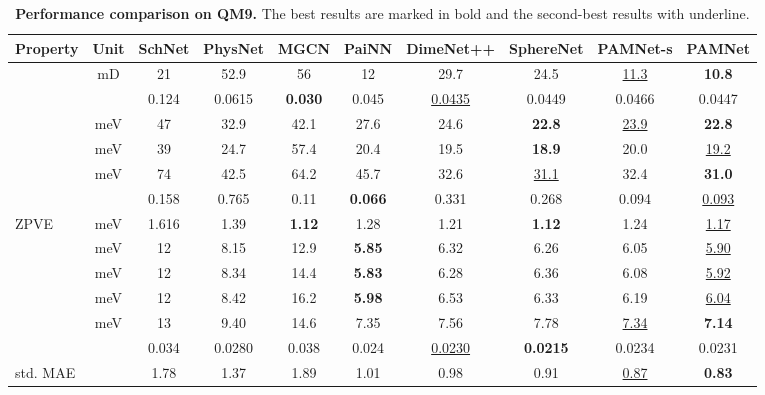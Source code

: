 \documentclass[fleqn,10pt]{wlscirep}
\newcommand{\method}{PAMNet\xspace}
\begin{document}
\begin{table}[t]
\centering
\small
\begin{tabular}{lccccccccc}
\toprule
    {Property} & {Unit} & {SchNet} & {PhysNet} & {MGCN} & {PaiNN} & {DimeNet++} & {SphereNet} & \textbf{\method-s}  & \textbf{\method}\\
\midrule
      &  mD     & 21 & 52.9 & 56 & 12 & 29.7 & 24.5 & \underline{11.3} & \textbf{10.8}\\
     &   & 0.124 & 0.0615 & \textbf{0.030} & 0.045 & \underline{0.0435} & 0.0449 & 0.0466 & 0.0447\\
     & meV  & 47 & 32.9 & 42.1 & 27.6 & 24.6 & \textbf{22.8} & \underline{23.9}  & \textbf{22.8}\\
     & meV  & 39 & 24.7 & 57.4 & 20.4 & 19.5 & \textbf{18.9} & 20.0  & \underline{19.2}\\
     & meV    & 74 & 42.5 & 64.2 & 45.7 & 32.6 & \underline{31.1} & 32.4 & \textbf{31.0}\\
     &   & 0.158 & 0.765 & 0.11 & \textbf{0.066} & 0.331 & 0.268 & 0.094 & \underline{0.093}\\
    ZPVE & meV  & 1.616 & 1.39 & \textbf{1.12} & 1.28 & 1.21 & \textbf{1.12} & 1.24 & \underline{1.17}\\
     & meV & 12 & 8.15 & 12.9 & \textbf{5.85} & 6.32 & 6.26 & 6.05 & \underline{5.90}\\
     & meV  & 12 & 8.34 & 14.4 & \textbf{5.83} & 6.28 & 6.36 & 6.08 & \underline{5.92} \\
     & meV   & 12 & 8.42 & 16.2 & \textbf{5.98} & 6.53 & 6.33 & 6.19 & \underline{6.04} \\
     & meV   & 13 & 9.40 & 14.6 & 7.35 & 7.56 & 7.78 & \underline{7.34} & \textbf{7.14} \\
     &   & 0.034 & 0.0280 & 0.038 & 0.024 & \underline{0.0230} & \textbf{0.0215} & 0.0234 & 0.0231 \\
\midrule
    std. MAE &   & 1.78 & 1.37 & 1.89 & 1.01 & 0.98 & 0.91 & \underline{0.87} & \textbf{0.83}\\
\bottomrule
\end{tabular}
\caption{\textbf{Performance comparison on QM9.} The best results are marked in bold and the second-best results with underline.}
\label{table:QM9}
\end{table}
\end{document}
